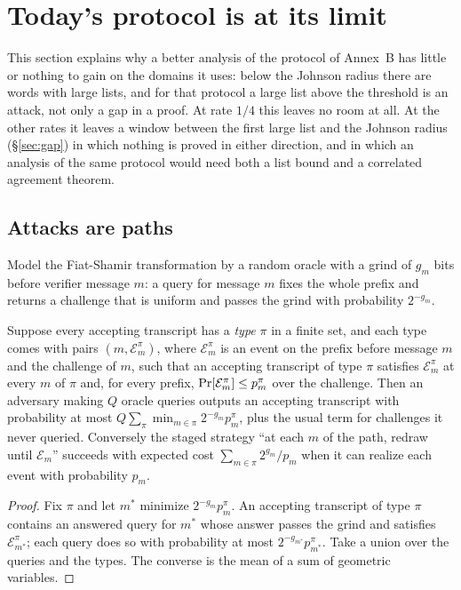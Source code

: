 \section{Today's protocol is at its limit}\label{sec:limit}

This section explains why a better analysis of the protocol of Annex~B has little or nothing to gain on the domains it uses: below the Johnson radius there are words with large lists, and for that protocol a large list above the threshold is an attack, not only a gap in a proof. At rate $1/4$ this leaves no room at all. At the other rates it leaves a window between the first large list and the Johnson radius (\S\ref{sec:gap}) in which nothing is proved in either direction, and in which an analysis of the same protocol would need both a list bound and a correlated agreement theorem.

\subsection{Attacks are paths}\label{sec:paths}

Model the Fiat-Shamir transformation by a random oracle with a grind of $g_m$ bits before verifier message $m$: a query for message $m$ fixes the whole prefix and returns a challenge that is uniform and passes the grind with probability $2^{-g_m}$.

\begin{lemma}[Paths]\label{lem:paths}
Suppose every accepting transcript has a \emph{type} $\pi$ in a finite set, and each type comes with pairs $(m,\mathcal E^\pi_m)$, where $\mathcal E^\pi_m$ is an event on the prefix before message $m$ and the challenge of $m$, such that an accepting transcript of type $\pi$ satisfies $\mathcal E^\pi_m$ at every $m$ of $\pi$ and, for every prefix, $\Pr[\mathcal E^\pi_m]\le p^\pi_m$ over the challenge. Then an adversary making $Q$ oracle queries outputs an accepting transcript with probability at most $Q\sum_\pi\min_{m\in\pi}2^{-g_m}p^\pi_m$, plus the usual term for challenges it never queried. Conversely the staged strategy ``at each $m$ of the path, redraw until $\mathcal E_m$'' succeeds with expected cost $\sum_{m\in\pi}2^{g_m}/p_m$ when it can realize each event with probability $p_m$.
\end{lemma}
\begin{proof}
Fix $\pi$ and let $m^\ast$ minimize $2^{-g_m}p^\pi_m$. An accepting transcript of type $\pi$ contains an answered query for $m^\ast$ whose answer passes the grind and satisfies $\mathcal E^\pi_{m^\ast}$; each query does so with probability at most $2^{-g_{m^\ast}}p^\pi_{m^\ast}$. Take a union over the queries and the types. The converse is the mean of a sum of geometric variables.
\end{proof}

